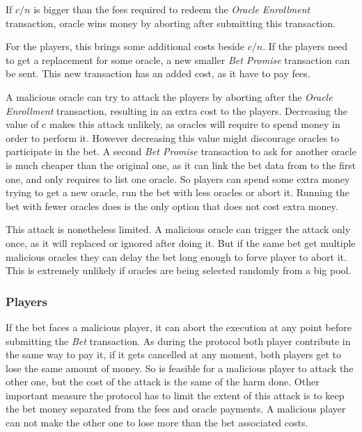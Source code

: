 If $c/n$ is bigger than the fees required to redeem the
  \textit{Oracle Enrollment} transaction, oracle wins money by aborting after
  submitting this transaction.

For the players, this brings some additional costs beside $c/n$.
If the players need to get a replacement for some oracle, a new smaller
  \textit{Bet Promise} transaction can be sent.
This new transaction has an added cost, as it have to pay fees.

A malicious oracle can try to attack the players by aborting after the
  \textit{Oracle Enrollment} transaction, resulting in an extra cost to the
  players.
Decreasing the value of c makes this attack unlikely, as oracles will require
  to spend money in order to perform it.
However decreasing this value might discourage oracles to participate in the
  bet.
A second \textit{Bet Promise} transaction to ask for another oracle is much
  cheaper than the original one, as it can link the bet data from to the first
  one, and only requires to list one oracle.
So players can spend some extra money trying to get a new oracle, run the bet
  with less oracles or abort it.
Running the bet with fewer oracles does is the only option that does not cost
  extra money.

This attack is nonetheless limited.
A malicious oracle can trigger the attack only once, as it will replaced or
  ignored after doing it.
But if the same bet get multiple malicious oracles they can delay the bet long
  enough to forve player to abort it.
This is extremely unlikely if oracles are being selected randomly from a big
  pool.

\subsubsection{Players} \label{subsec:individual_attack_player}
If the bet faces a malicious player, it can abort the execution at any point
  before submitting the \textit{Bet} transaction.
As during the protocol both player contribute in the same way to pay it, if it
  gets cancelled at any moment, both players get to lose the same amount of
  money.
So is feasible for a malicious player to attack the other one, but the cost
  of the attack is the same of the harm done.
Other important measure the protocol has to limit the extent of this attack
  is to keep the bet money separated from the fees and oracle payments.
A malicious player can not make the other one to lose more than the bet
  associated costs.

